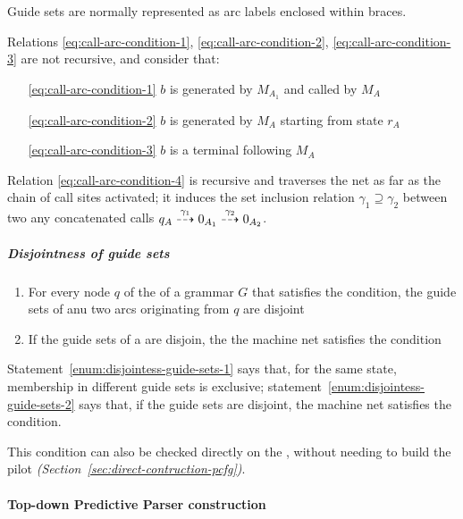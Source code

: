 \documentclass[english]{article}
\begin{document}
Guide sets are normally represented as arc labels enclosed within braces.

Relations \ref{eq:call-arc-condition-1}, \ref{eq:call-arc-condition-2}, \ref{eq:call-arc-condition-3} are not recursive, and consider that:

\begin{enumerate}
  \item[\ref{eq:call-arc-condition-1}] \(b\) is generated by \(M_{A_1}\) and called by \(M_A\)
  \item[\ref{eq:call-arc-condition-2}] \(b\) is generated by \(M_A\) starting from state \(r_A\)
  \item[\ref{eq:call-arc-condition-3}] \(b\) is a terminal following \(M_A\)
\end{enumerate}

Relation \ref{eq:call-arc-condition-4} is recursive and traverses the net as far as the chain of call sites activated;
it induces the set inclusion relation \(\gamma_1 \supseteq \gamma_2\) between two any concatenated calls \(q_A \stackrel{\gamma_1}{\dashrightarrow} 0_{A_1} \stackrel{\gamma_2}{\dashrightarrow} 0_{A_2}\).

\subparagraph*{Disjointness of guide sets}

\begin{enumerate}[label=\textbf{\Alph*.}, ref=(\Alph*)]
  \item\label{enum:disjointess-guide-sets-1} For every node \(q\) of the \PCFG of a grammar \(G\) that satisfies the \ello condition, the guide sets of anu two arcs originating from \(q\) are disjoint
  \item\label{enum:disjointess-guide-sets-2} If the guide sets of a \PCFG are disjoin, the the machine net satisfies the \ello condition
\end{enumerate}

\bigskip
Statement~\ref{enum:disjointess-guide-sets-1} says that, for the same state, membership in different guide sets is exclusive;
statement~\ref{enum:disjointess-guide-sets-2} says that, if the guide sets are disjoint, the machine net satisfies the \ello condition.

This condition can also be checked directly on the \PCFG, without needing to build the \elro pilot \textit{(Section~\ref{sec:direct-contruction-pcfg})}.

\paragraph{Top-down Predictive Parser construction}
\label{par:top-down-predictive-parser-construction}
\end{document}
